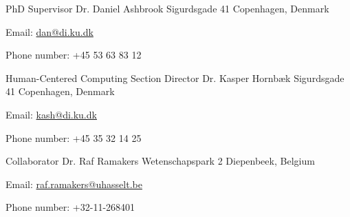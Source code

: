 \begin{cventries}
  \cventry
    {PhD Supervisor}
    {Dr. Daniel Ashbrook}
    {Sigurdsgade 41}
    {Copenhagen, Denmark}
    {
      \begin{cvitems}
        \item{Email: \href{mailto:dan@di.ku.dk}{dan@di.ku.dk}}
        \item{Phone number: +45 53 63 83 12}
      \end{cvitems}
      \vspace{1em}
    }

  \cventry
    {Human-Centered Computing Section Director}
    {Dr. Kasper Hornb\ae k}
    {Sigurdsgade 41}
    {Copenhagen, Denmark}
    {
      \begin{cvitems}
        \item{Email: \href{mailto:kash@di.ku.dk}{kash@di.ku.dk}}
        \item{Phone number: +45 35 32 14 25}
      \end{cvitems}
      \vspace{1em}
    }

  \cventry
    {Collaborator}
    {Dr. Raf Ramakers}
    {Wetenschapspark 2}
    {Diepenbeek, Belgium}
    {
      \begin{cvitems}
        \item{Email: \href{mailto:raf.ramakers@uhasselt.be}{raf.ramakers@uhasselt.be}}
        \item{Phone number: ​+32-11-268401}
      \end{cvitems}
      \vspace{1em}
    }

\end{cventries}
